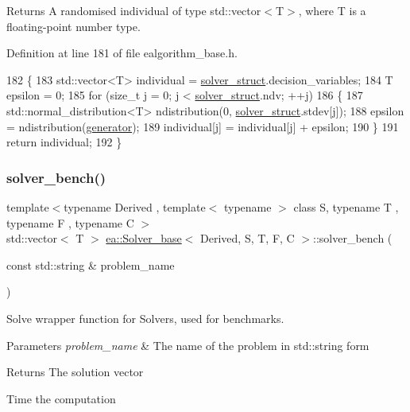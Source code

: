 \begin{DoxyReturn}{Returns}
A randomised individual of type std\+::vector$<$\+T$>$, where T is a floating-\/point number type. 
\end{DoxyReturn}


Definition at line 181 of file ealgorithm\+\_\+base.\+h.


\begin{DoxyCode}
182     \{
183         std::vector<T> individual = \hyperlink{classea_1_1_solver__base_a5e1d821809f2d26c6f882942ad728127}{solver\_struct}.decision\_variables;
184         T epsilon = 0;
185         \textcolor{keywordflow}{for} (\textcolor{keywordtype}{size\_t} j = 0; j < \hyperlink{classea_1_1_solver__base_a5e1d821809f2d26c6f882942ad728127}{solver\_struct}.ndv; ++j)
186         \{
187             std::normal\_distribution<T> ndistribution(0, \hyperlink{classea_1_1_solver__base_a5e1d821809f2d26c6f882942ad728127}{solver\_struct}.stdev[j]);
188             epsilon = ndistribution(\hyperlink{namespaceea_a385e8ca8ba4ae2f69dcfffa79f20c2ff}{generator});
189             individual[j] = individual[j] + epsilon;
190         \}
191         \textcolor{keywordflow}{return} individual;
192     \}
\end{DoxyCode}
\mbox{\label{classea_1_1_solver__base_aa5cf33a16448e3a0ea3ddb61a3573fb0}} 
\subsubsection{\texorpdfstring{solver\+\_\+bench()}{solver\_bench()}}
{\footnotesize\ttfamily template$<$typename Derived , template$<$ typename $>$ class S, typename T , typename F , typename C $>$ \\
std\+::vector$<$ T $>$ \hyperlink{classea_1_1_solver__base}{ea\+::\+Solver\+\_\+base}$<$ Derived, S, T, F, C $>$\+::solver\+\_\+bench (\begin{DoxyParamCaption}\item[{const std\+::string \&}]{problem\+\_\+name }\end{DoxyParamCaption})}



Solve wrapper function for Solvers, used for benchmarks. 


\begin{DoxyParams}{Parameters}
{\em problem\+\_\+name} & The name of the problem in std\+::string form \\
\hline
\end{DoxyParams}
\begin{DoxyReturn}{Returns}
The solution vector 
\end{DoxyReturn}
Time the computation

